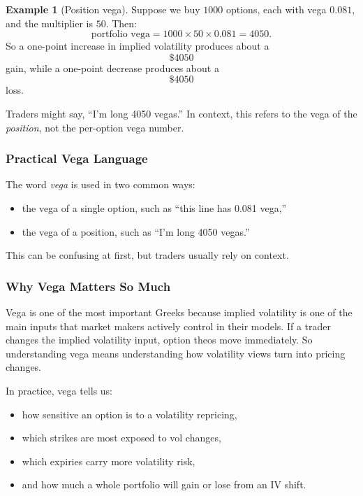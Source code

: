 \documentclass[11pt]{article}
\theoremstyle{definition}
\newtheorem{example}{Example}[section]
\begin{document}
\begin{example}[Position vega]
Suppose we buy \(1000\) options, each with vega \(0.081\), and the multiplier is \(50\). Then:
\[
\text{portfolio vega} = 1000 \times 50 \times 0.081 = 4050.
\]
So a one-point increase in implied volatility produces about a
\[
\$4050
\]
gain, while a one-point decrease produces about a
\[
\$4050
\]
loss.
\end{example}

Traders might say, ``I'm long 4050 vegas.'' In context, this refers to the vega of the \emph{position}, not the per-option vega number.

\subsubsection*{Practical Vega Language}

The word \emph{vega} is used in two common ways:

\begin{itemize}
    \item the vega of a single option, such as ``this line has 0.081 vega,''
    \item the vega of a position, such as ``I'm long 4050 vegas.''
\end{itemize}

This can be confusing at first, but traders usually rely on context.

\subsubsection*{Why Vega Matters So Much}

Vega is one of the most important Greeks because implied volatility is one of the main inputs that market makers actively control in their models. If a trader changes the implied volatility input, option theos move immediately. So understanding vega means understanding how volatility views turn into pricing changes.

In practice, vega tells us:
\begin{itemize}
    \item how sensitive an option is to a volatility repricing,
    \item which strikes are most exposed to vol changes,
    \item which expiries carry more volatility risk,
    \item and how much a whole portfolio will gain or lose from an IV shift.
\end{itemize}
\end{document}

